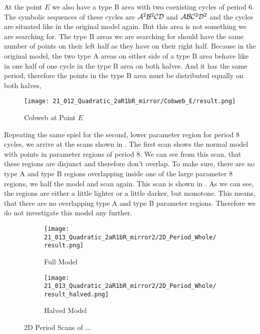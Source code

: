 At the point $E$ we also have a type B area with two coexisting cycles of period 6.
The symbolic sequences of these cycles are $\mathcal{A}^2\mathcal{B}^2\mathcal{C}\mathcal{D}$ and $\mathcal{A}\mathcal{B}\mathcal{C}^2\mathcal{D}^2$ and the cycles are situated like in the original model again.
But this area is not something we are searching for.
The type B areas we are searching for should have the same number of points on their left half as they have on their right half.
Because in the original model, the two type A areas on either side of a type B area behave like in one half of one cycle in the type B area on both halves.
And it has the same period, therefore the points in the type B area must be distributed equally on both halves,

\begin{figure}
    \centering
    \texttt{[image: 21\_012\_Quadratic\_2aR1bR\_mirror/Cobweb\_E/result.png]}
    \caption{Cobweb at Point $E$}
    \label{fig:quadratic.full.2aR1bR_mirr.1.CobwebE}
\end{figure}

Repeating the same spiel for the second, lower parameter region for period 8 cycles, we arrive at the scans shown in .
The first scan shows the normal model with points in parameter regions of period 8.
We can see from this scan, that these regions are disjunct and therefore don't overlap.
To make sure, there are no type A and type B regions overlapping inside one of the large parameter 8 regions, we half the model and scan again.
This scan is shown in .
As we can see, the regions are either a little lighter or a little darker, but monotone.
This means, that there are no overlapping type A and type B parameter regions.
Therefore we do not investigate this model any further.

\begin{figure}
    \centering
    \begin{subfigure}{0.4\textwidth}
        \centering
        \texttt{[image: 21\_013\_Quadratic\_2aR1bR\_mirror2/2D\_Period\_Whole/result.png]}
        \caption{Full Model}
        \label{fig:quad.full.2aR1bR_cL_mirr.2.whole}
    \end{subfigure}
    \begin{subfigure}{0.4\textwidth}
        \centering
        \texttt{[image: 21\_013\_Quadratic\_2aR1bR\_mirror2/2D\_Period\_Whole/result\_halved.png]}
        \caption{Halved Model}
        \label{fig:quad.full.2aR1bR_cL_mirr.2.Halved}
    \end{subfigure}
    \caption{2D Period Scans of ...}
    \label{fig:quad.full.2aR1bR_cL_mirr.2.Period}
\end{figure}
